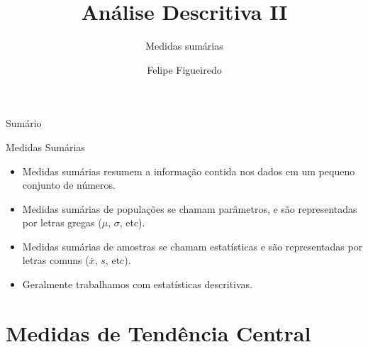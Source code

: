 \documentclass{beamer}
\title%
{Análise Descritiva II}
\subtitle
{Medidas sumárias} %
\author%
{Felipe Figueiredo}%
\institute[INTO] %
{
Instituto Nacional de Traumatologia e Ortopedia}
\date%
{}
\begin{document}
\begin{frame}
  \titlepage
\end{frame}

\begin{frame}{Sumário}
  \tableofcontents
\end{frame}




\begin{frame}{Medidas Sumárias}
  \begin{itemize}
  \item Medidas sumárias resumem a informação contida nos dados em um
    pequeno conjunto de números.
  \item Medidas sumárias de \alert{populações} se chamam
    \alert{parâmetros}, e são representadas por letras gregas ($\mu$,
    $\sigma$, etc).
  \item Medidas sumárias de \alert{amostras} se chamam \alert{estatísticas} e são representadas por letras comuns ($\bar{x}$,
    $s$, etc).
  \item Geralmente trabalhamos com estatísticas descritivas.
  \end{itemize}
\end{frame}

\section{Medidas de Tendência Central}
\end{document}
